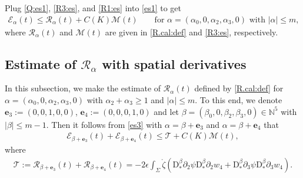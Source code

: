 \documentclass[twoside,11pt]{article}
\numberwithin{equation}{section}
\def\p{\partial}
\begin{document}
Plug \eqref{Q:es1}, \eqref{R3:es}, and \eqref{R1:es} into \eqref{es1} to get
\begin{align}
	\mathcal{E}_{\alpha}(t)
	\leq \mathcal{R}_{\alpha}(t)+C(K)\mathcal{M}(t)\qquad
	\textrm{for } \alpha=(\alpha_0,0,\alpha_2,\alpha_3,0) \textrm{ with }|\alpha|\leq m,
	\label{es3}
\end{align}
where $\mathcal{R}_{\alpha}(t)$ and $\mathcal{M}(t)$ are given in \eqref{R.cal:def} and \eqref{R3:es}, respectively.
	







\subsection{Estimate of $\mathcal{R}_{\alpha}$ with spatial derivatives} \label{sec:Qes1}
In this subsection, we make the estimate of $\mathcal{R}_{\alpha}(t)$ defined by \eqref{R.cal:def} for $\alpha=(\alpha_0,0,\alpha_2, \alpha_3,0)$ with $\alpha_2+\alpha_3\geq 1$ and $|\alpha|\leq m$.
To this end, we
denote $\mathbf{e}_3:=(0,0,1,0,0)$, $\mathbf{e}_4:=(0,0,0,1,0)$
and let $\beta=(\beta_0,0,\beta_2, \beta_3,0)\in\mathbb{N}^5$ with $|\beta|\leq m-1$.
Then it follows from \eqref{es3} with $\alpha=\beta+\mathbf{e}_3$ and $\alpha=\beta+\mathbf{e}_4$  that
\begin{align}
	\mathcal{E}_{\beta+\mathbf{e}_3}(t)+
	\mathcal{E}_{\beta+\mathbf{e}_4}(t)
	\leq
	 \mathcal{T}+
	C(K)\mathcal{M}(t)
,
	\label{es4}
\end{align}
where
\begin{align}
\label{T.cal:def}
 \mathcal{T} := \mathcal{R}_{\beta+\mathbf{e}_3}(t)
 +\mathcal{R}_{\beta+\mathbf{e}_4}(t)=
	-2\epsilon \int_{\Sigma} \mathring{\zeta}
	\left(\mathrm{D}_*^{\beta} \p_2\psi\mathrm{D}_*^{\beta} \p_2{w_4}
	+	\mathrm{D}_*^{\beta} \p_3\psi\mathrm{D}_*^{\beta} \p_3{w_4}\right).
\end{align}
\end{document}
